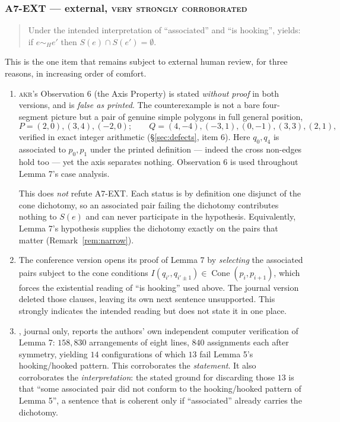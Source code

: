 \documentclass[11pt,a4paper]{article}
\theoremstyle{plain}
\theoremstyle{definition}
\theoremstyle{remark}
\newcommand{\Cone}{\operatorname{Cone}}
\newcommand{\stat}[1]{\footnotesize\textsc{#1}}
\begin{document}
\subsubsection*{\textsf{A7-EXT} --- external, \stat{very strongly corroborated}}

\begin{quote}
Under the intended interpretation of ``associated'' and ``is hooking'',
\cite[Lemma 7]{AckermanKeszeghRote2022} yields: if $e\sim_H e'$ then
$S(e)\cap S(e')=\emptyset$.
\end{quote}

This is the one item that remains subject to external human review, for three
reasons, in increasing order of comfort.
\begin{enumerate}[leftmargin=*]
  \item \textsc{akr}'s Observation 6 (the Axis Property) is stated
    \emph{without proof} in both versions, and is \emph{false as printed}. The
    counterexample is not a bare four-segment picture but a pair of genuine
    simple polygons in full general position,
    \[
      P=(2,0),(3,4),(-2,0);\qquad Q=(4,-4),(-3,1),(0,-1),(3,3),(2,1),
    \]
    verified in exact integer arithmetic (\S\ref{sec:defects}, item 6). Here
    $q_0,q_4$ is associated to $p_0,p_1$ under the printed definition --- indeed
    the cross non-edges hold too --- yet the axis separates nothing. Observation 6
    is used throughout Lemma 7's case analysis.

    This does \emph{not} refute \textsf{A7-EXT}. Each status is by definition one
    disjunct of the cone dichotomy, so an associated pair failing the dichotomy
    contributes nothing to $S(e)$ and can never participate in the hypothesis.
    Equivalently, Lemma 7's hypothesis supplies the dichotomy exactly on the
    pairs that matter (Remark~\ref{rem:narrow}).
  \item The conference version \cite{AckermanKeszeghRote2020} opens its proof of
    Lemma 7 by \emph{selecting} the associated pairs subject to the cone
    conditions $I(q_{i'},q_{i'\pm1})\in\Cone(p_i,p_{i+1})$, which forces the
    existential reading of ``is hooking'' used above. The journal version deleted
    those clauses, leaving its own next sentence unsupported. This strongly
    indicates the intended reading but does not state it in one place.
  \item \cite[\S10.2]{AckermanKeszeghRote2022}, journal only, reports the
    authors' own independent computer verification of Lemma 7: $158{,}830$
    arrangements of eight lines, $840$ assignments each after symmetry, yielding
    $14$ configurations of which $13$ fail Lemma 5's hooking/hooked pattern. This
    corroborates the \emph{statement}. It also corroborates the
    \emph{interpretation}: the stated ground for discarding those $13$ is that
    ``some associated pair did not conform to the hooking/hooked pattern of
    Lemma 5'', a sentence that is coherent only if ``associated'' already carries
    the dichotomy.


\end{enumerate}
\end{document}
